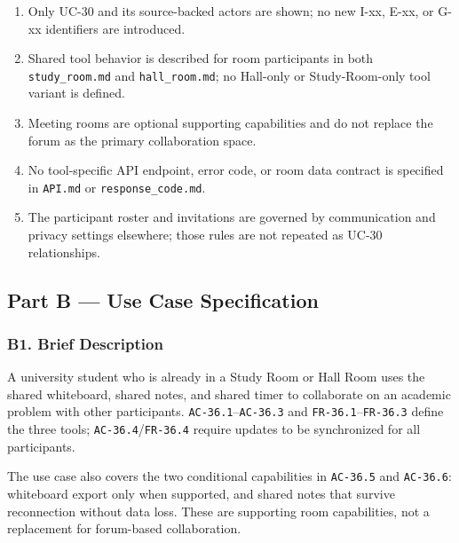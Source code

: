 \documentclass[12pt]{article}
\begin{document}
\begin{enumerate}
\item Only UC-30 and its source-backed actors are shown; no new I-xx, E-xx, or G-xx identifiers are introduced.
\item Shared tool behavior is described for room participants in both \texttt{study\_room.md} and \texttt{hall\_room.md}; no Hall-only or Study-Room-only tool variant is defined.
\item Meeting rooms are optional supporting capabilities and do not replace the forum as the primary collaboration space.
\item No tool-specific API endpoint, error code, or room data contract is specified in \texttt{API.md} or \texttt{response\_code.md}.
\item The participant roster and invitations are governed by communication and privacy settings elsewhere; those rules are not repeated as UC-30 relationships.
\end{enumerate}
\par\medskip

\hypertarget{sec:part-b-use-case-specification}{}
\subsection*{Part B --- Use Case Specification}
\par\medskip

\hypertarget{sec:b1-brief-description}{}
\subsubsection*{B1. Brief Description}
\par\medskip

A university student who is already in a Study Room or Hall Room uses the shared whiteboard, shared notes, and shared timer to collaborate on an academic problem with other participants. \texttt{AC-36.1}--\texttt{AC-36.3} and \texttt{FR-36.1}--\texttt{FR-36.3} define the three tools; \texttt{AC-36.4}/\texttt{FR-36.4} require updates to be synchronized for all participants.
\par\medskip

The use case also covers the two conditional capabilities in \texttt{AC-36.5} and \texttt{AC-36.6}: whiteboard export only when supported, and shared notes that survive reconnection without data loss. These are supporting room capabilities, not a replacement for forum-based collaboration.
\par\medskip
\end{document}
